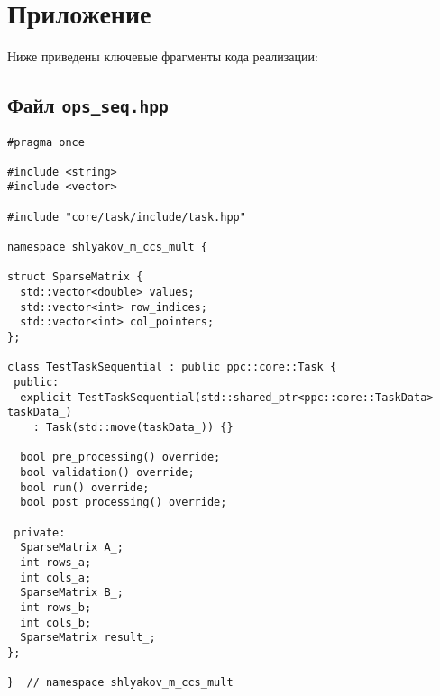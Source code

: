 \documentclass[12pt]{article}
\begin{document}
\section*{Приложение}
Ниже приведены ключевые фрагменты кода реализации:

\subsection*{Файл \texttt{ops\_seq.hpp}}
\begin{verbatim}
#pragma once

#include <string>
#include <vector>

#include "core/task/include/task.hpp"

namespace shlyakov_m_ccs_mult {

struct SparseMatrix {
  std::vector<double> values;
  std::vector<int> row_indices;
  std::vector<int> col_pointers;
};

class TestTaskSequential : public ppc::core::Task {
 public:
  explicit TestTaskSequential(std::shared_ptr<ppc::core::TaskData> taskData_) 
    : Task(std::move(taskData_)) {}
  
  bool pre_processing() override;
  bool validation() override;
  bool run() override;
  bool post_processing() override;

 private:
  SparseMatrix A_;
  int rows_a;
  int cols_a;
  SparseMatrix B_;
  int rows_b;
  int cols_b;
  SparseMatrix result_;
};

}  // namespace shlyakov_m_ccs_mult
\end{verbatim}
\newpage

\end{document}
